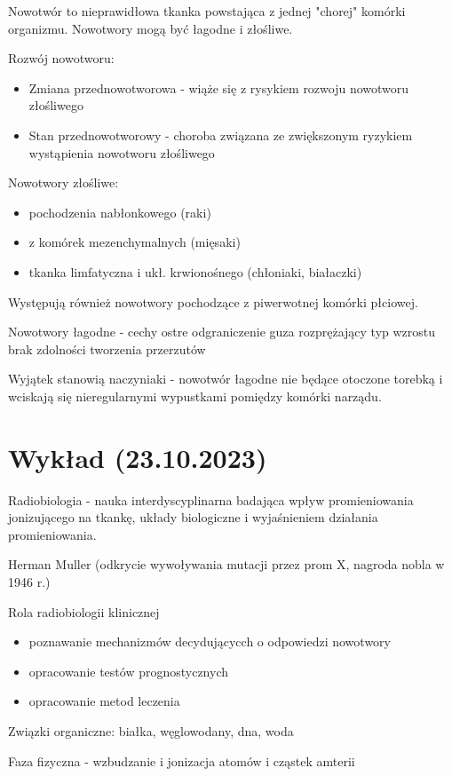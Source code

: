 \documentclass{article}
\begin{document}
Nowotwór to nieprawidłowa tkanka powstająca z jednej "chorej" komórki organizmu. Nowotwory mogą być łagodne i złośliwe.

Rozwój nowotworu:
\begin{itemize}
    \item Zmiana przednowotworowa - wiąże się z rysykiem rozwoju nowotworu złośliwego
    \item Stan przednowotworowy - choroba związana ze zwiększonym ryzykiem wystąpienia nowotworu złośliwego
\end{itemize}

Nowotwory złośliwe:
\begin{itemize}
    \item pochodzenia nabłonkowego (raki)
    \item z komórek mezenchymalnych (mięsaki)
    \item tkanka limfatyczna i ukł. krwionośnego (chłoniaki, białaczki)
\end{itemize}
Występują również nowotwory pochodzące z piwerwotnej komórki płciowej.

Nowotwory łagodne - cechy
ostre odgraniczenie guza
rozprężający typ wzrostu
brak zdolności tworzenia przerzutów

Wyjątek stanowią naczyniaki - nowotwór łagodne nie będące otoczone torebką i wciskają się nieregularnymi wypustkami pomiędzy komórki narządu.

\section{Wykład (23.10.2023)}

Radiobiologia - nauka interdyscyplinarna badająca wpływ promieniowania jonizującego na tkankę, układy biologiczne i wyjaśnieniem działania promieniowania.

Herman Muller (odkrycie wywoływania mutacji przez prom X, nagroda nobla w 1946 r.)

Rola radiobiologii klinicznej
\begin{itemize}
    \item poznawanie mechanizmów decydującycch o odpowiedzi nowotwory
    \item opracowanie testów prognostycznych
    \item opracowanie metod leczenia
\end{itemize}

Związki organiczne: białka, węglowodany, dna, woda

Faza fizyczna - wzbudzanie i jonizacja atomów i cząstek amterii
\end{document}

